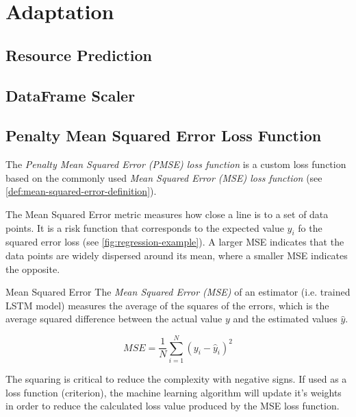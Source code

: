   



  

  



  

\section{Adaptation}
  \subsection{Resource Prediction}
  \subsection{DataFrame Scaler}
  \subsection{Penalty Mean Squared Error Loss Function}
  \label{sec:penalty-mse-loss-function-architecture-and-implementation}

    The \emph{Penalty Mean Squared Error (PMSE) loss function} is a custom loss function based on the commonly used \emph{Mean Squared Error (MSE) loss function} \cite{koksoyMultiresponseRobustDesign2006} (see \ref{def:mean-squared-error-definition}). 
    
    The Mean Squared Error metric measures how close a  line is to a set of data points. It is a risk function that corresponds to the expected value $y_i$ fo the squared error loss (see \ref{fig:regression-example}). A larger MSE indicates that the data points are widely dispersed around its mean, where a smaller MSE indicates the opposite.

    \begin{pabox}{Mean Squared Error}
    \label{def:mean-squared-error-definition}
      The \emph{Mean Squared Error (MSE)} of an estimator (i.e. trained LSTM model) measures the average of the squares of the errors, which is the average squared difference between the actual value $y$ and the estimated values $\hat{y}$.

      $$MSE = \frac{1}{N} \sum_{i = 1}^{N}\left(y_i - \hat{y}_i\right)^2$$

      The squaring is critical to reduce the complexity with negative signs. If used as a loss function (criterion), the machine learning algorithm will update it's weights in order to reduce the calculated loss value produced by the MSE loss function.
    \end{pabox}

